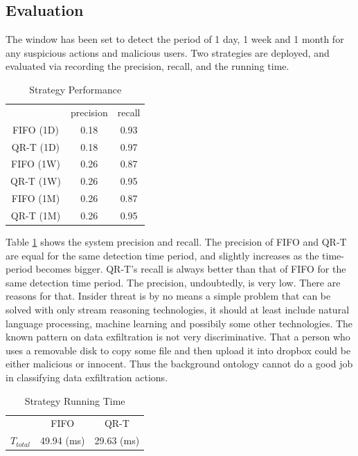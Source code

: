 \subsection{Evaluation}
The window has been set to detect the period of 1 day, 1 week and 1 month for any suspicious actions and malicious users. 
Two strategies are deployed, and evaluated via recording the precision, recall, and the running time. 

\begin{table}[!htbp]
	\centering
    \caption{Strategy Performance}
    \label{tab:sp}
    \begin{tabular}{|c||c|c|} \hline
    	& precision & recall \\ \hhline{|=#=|=|}
        FIFO (1D) & 0.18 & 0.93 \\ \hline
        QR-T (1D) & 0.18 & 0.97 \\ \hline
        FIFO (1W) & 0.26 & 0.87 \\ \hline
        QR-T (1W) & 0.26 & 0.95 \\ \hline
        FIFO (1M) & 0.26 & 0.87 \\ \hline
        QR-T (1M) & 0.26 & 0.95 \\ \hline
    \end{tabular}
\end{table}

Table \ref{tab:sp} shows the system precision and recall. 
The precision of FIFO and QR-T are equal for the same detection time period, and slightly increases as the time-period becomes bigger. 
QR-T's recall is always better than that of FIFO for the same detection time period. 
The precision, undoubtedly, is very low. 
There are reasons for that. 
Insider threat is by no means a simple problem that can be solved with only stream reasoning technologies, it should at least include natural language processing, machine learning and possibily some other technologies. 
The known pattern on data exfiltration is not very discriminative.
That a person who uses a removable disk to copy some file and then upload it into dropbox could be either malicious or innocent.
Thus the background ontology cannot do a good job in classifying data exfiltration actions.

\begin{table}[!htbp]
	\centering
    \caption{Strategy Running Time}
    \label{tab:srt}
    \begin{tabular}{|c||c|c|} \hline
	    & FIFO & QR-T \\ \hhline{|=#=|=|}
    	$T_{total}$ & 49.94 (ms) & 29.63 (ms) \\ \hline    
    \end{tabular}	
\end{table}

